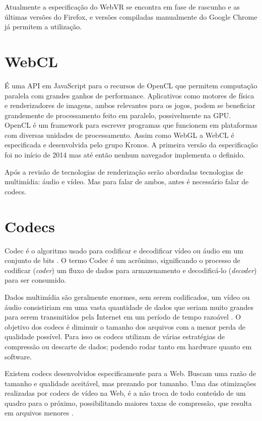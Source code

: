 Atualmente a especificação do WebVR se encontra em fase de rascunho e
as últimas versões do Firefox, e versões compiladas manualmente do
Google Chrome já permitem a utilização.
\section{WebCL}
É uma API em JavaScript para o recursos de OpenCL que permitem
computação paralela com grandes ganhos de performance. Aplicativos
como motores de física e renderizadores de imagens, ambos relevantes
para os jogos, podem se beneficiar grandemente de processamento feito
em paralelo, possivelmente na GPU. OpenCL é um framework para escrever
programas que funcionem em plataformas com diversas unidades de
processamento. Assim como WebGL a WebCL é especificada e desenvolvida
pelo grupo Kronos. A primeira versão da especificação foi no início
de 2014 mas até então nenhum navegador implementa o definido.

Após a revisão de tecnologias de renderização serão abordadas
tecnologias de multimídia: áudio e vídeo. Mas para falar de ambos,
antes é necessário falar de codecs.

\section{Codecs}

Codec é o algoritmo usado para codificar e decodificar vídeo ou
áudio em um conjunto de bits \autocite{diveIntohtml}. O termo Codec é
um acrônimo, significando o processo de codificar (\textit{coder}) um fluxo de dados
para armazenamento e decodificá-lo (\textit{decoder}) para ser consumido.

Dados multimídia são geralmente enormes, sem serem codificados,
um vídeo ou áudio consistiriam em uma vasta quantidade de dados
que seriam muito grandes para serem transmitidos pela Internet em um
período de tempo razoável \autocite[p. 66]{proHtml5}. O objetivo dos
codecs é diminuir o tamanho dos arquivos com a menor perda de qualidade
possível. Para isso os codecs utilizam de várias estratégias de
compressão ou descarte de dados; podendo rodar tanto em hardware quanto
em software.

Existem codecs desenvolvidos especificamente para a Web. Buscam
uma razão de tamanho e qualidade aceitável, mas prezando por
tamanho. Uma das otimizações realizadas por codecs de vídeo na
Web, é a não troca de todo conteúdo de um quadro para o próximo,
possibilitando maiores taxas de compressão, que resulta em arquivos
menores \autocite{diveIntohtml}.

